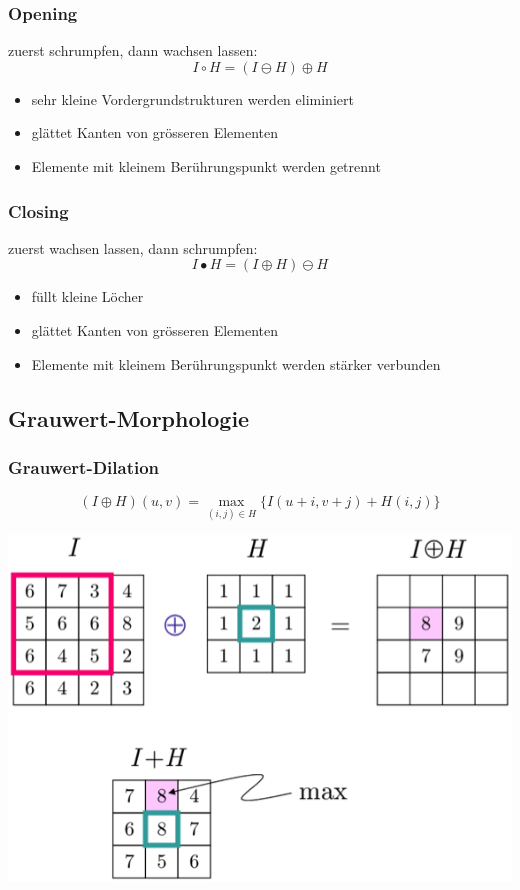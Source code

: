\documentclass[10pt]{article}
\begin{document}
\subsubsection*{Opening}
zuerst schrumpfen, dann wachsen lassen:
\begin{equation*}
	I \circ H = (I \ominus H) \oplus H
\end{equation*}
\begin{itemize}
	\item sehr kleine Vordergrundstrukturen werden eliminiert
	\item glättet Kanten von grösseren Elementen
	\item Elemente mit kleinem Berührungspunkt werden getrennt
\end{itemize}
\subsubsection*{Closing}
zuerst wachsen lassen, dann schrumpfen:
\begin{equation*}
	I \bullet H = (I \oplus H) \ominus H
\end{equation*}
\begin{itemize}
	\item füllt kleine Löcher
	\item glättet Kanten von grösseren Elementen
	\item Elemente mit kleinem Berührungspunkt werden stärker verbunden
\end{itemize}

\subsection{Grauwert-Morphologie}
\subsubsection*{Grauwert-Dilation}
\begin{equation*}
	(I \oplus H)(u, v) = \max_{(i,j) \in H} \{ I(u+i,v+j) + H(i,j) \}
\end{equation*}
\begin{center}
	\includegraphics[scale=0.25]{grauwert-dilation.png}
\end{center}
\end{document}

